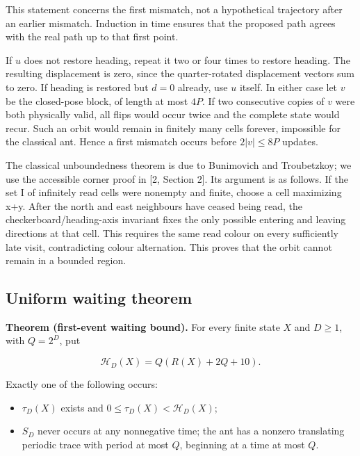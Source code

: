 \documentclass[
  11pt,
]{article}
\providecommand{\tightlist}{%
  \setlength{\itemsep}{0pt}\setlength{\parskip}{0pt}}
\begin{document}
This statement concerns the first mismatch, not a hypothetical
trajectory after an earlier mismatch. Induction in time ensures that the
proposed path agrees with the real path up to that first point.

If \(u\) does not restore heading, repeat it two or four times to restore
heading. The resulting displacement is zero, since the quarter-rotated
displacement vectors sum to zero. If heading is restored but \(d=0\)
already, use \(u\) itself. In either case let \(v\) be the closed-pose block, of
length at most \(4P\). If two consecutive copies of \(v\) were both physically
valid, all flips would occur twice and the complete state would recur.
Such an orbit would remain in finitely many cells forever, impossible
for the classical ant. Hence a first mismatch occurs before
$2|v|\le8P$ updates.

The classical unboundedness theorem is due to Bunimovich and Troubetzkoy;
we use the accessible corner proof in [2, Section 2]. Its argument is as
follows. If the set I of infinitely read cells were nonempty and finite,
choose a cell maximizing x+y. After the north and east neighbours have
ceased being read, the checkerboard/heading-axis invariant fixes the
only possible entering and leaving directions at that cell. This
requires the same read colour on every sufficiently late visit,
contradicting colour alternation. This proves that the orbit cannot remain
in a bounded region.

\subsection{Uniform waiting theorem}\label{sm-4}

\textbf{Theorem (first-event waiting bound).} For every finite state \(X\) and $D\ge1$, with
$Q=2^D$, put

\begin{equation}\label{eq:sm6}
\mathcal H_D(X)=Q(R(X)+2Q+10).
\end{equation}

Exactly one of the following occurs:

\begin{itemize}
\tightlist
\item
  $\tau_D(X)$ exists and $0\le\tau_D(X)<\mathcal H_D(X)$;
\item
  $S_D$ never occurs at any nonnegative time; the ant has a nonzero
  translating periodic trace with period at most $Q$, beginning at a
  time at most $Q$.
\end{itemize}
\end{document}
